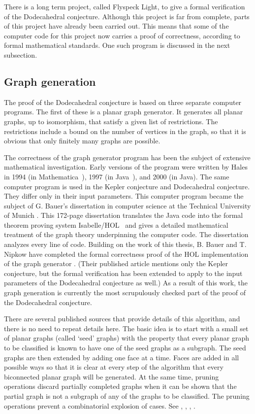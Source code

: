 \documentclass{article} %
\begin{document}
There is a long term project, called Flyspeck Light, to give a formal
verification of the Dodecahedral conjecture. Although this project is
far from complete, parts of this project have already been carried
out. This means that some of the computer code for this project now
carries a proof of correctness, according to formal mathematical
standards. One such program is discussed in the next subsection.

\subsection{Graph generation}
\label{sec:gg}

The proof of the Dodecahedral conjecture is based on three separate
computer programs. The first of these is a planar graph generator. It
generates all planar graphs, up to isomorphism, that satisfy a given
list of restrictions. The restrictions include a bound on the number
of vertices in the graph, so that it is obvious that only finitely
many graphs are possible.

The correctness of the graph generator program has been the subject of
extensive mathematical investigation. Early versions of the program
were written by Hales in 1994 (in Mathematica~\cite{Wolfram:1999:MB}),
1997 (in Java~\cite{website:Java}), and 2000 (in Java). The same computer
program is used in the Kepler conjecture and Dodecahedral conjecture.
They differ only in their input parameters. This computer program
became the subject of G. Bauer's dissertation in computer science at
the Technical University of Munich \cite{Bauer:2006:Thesis}. This
172-page dissertation translates the Java code into the formal theorem
proving system Isabelle/HOL~\cite{Paulson:1994:Isabelle} and gives a
detailed mathematical treatment of the graph theory underpinning the
computer code. The dissertation analyzes every line of code. Building
on the work of this thesis, B. Bauer and T. Nipkow have completed the
formal correctness proof of the HOL implementation of the graph
generator \cite{Nipkow:2005:Tame}. (Their published article mentions
only the Kepler conjecture, but the formal verification has been
extended to apply to the input parameters of the Dodecahedral
conjecture as well.) As a result of this work, the graph generation is
currently the most scrupulously checked part of the proof of the
Dodecahedral conjecture.

There are several published sources that provide details of this
algorithm, and there is no need to repeat details here. The basic idea
is to start with a small set of planar graphs (called `seed' graphs)
with the property that every planar graph to be classified is known to
have one of the seed graphs as a subgraph. The seed graphs are then
extended by adding one face at a time. Faces are added in all possible
ways so that it is clear at every step of the algorithm that every
biconnected planar graph will be generated. At the same time, pruning
operations discard partially completed graphs when it can be shown
that the partial graph is not a subgraph of any of the graphs to be
classified. The pruning operations prevent a combinatorial explosion
of cases. See \cite[\S5]{Hales:2003:DCG}, \cite[\S19]{Hales:2006:DCG},
\cite{Bauer:2006:Thesis}, \cite{Nipkow:2005:Tame}.
\end{document}
